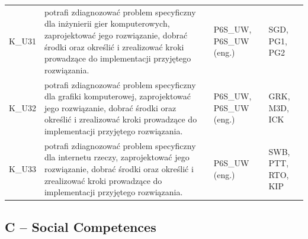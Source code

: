 \documentclass[12pt,a4paper]{article}
\begin{document}
{\begin{longtable}{m{1cm}m{8.8cm}m{2.1cm}m{2.5cm}}
\rowcolor{tableRowLight} K\_U31 & potrafi zdiagnozować problem specyficzny dla inżynierii gier komputerowych, zaprojektować jego rozwiązanie, dobrać środki oraz określić i zrealizować kroki prowadzące do implementacji przyjętego rozwiązania. & {\scriptsize P6S\_UW, P6S\_UW {\scriptsize (eng.)}} & {\scriptsize SGD, PG1, PG2} \\
\rowcolor{tableRowAlt} K\_U32 & potrafi zdiagnozować problem specyficzny dla grafiki komputerowej, zaprojektować jego rozwiązanie, dobrać środki oraz określić i zrealizować kroki prowadzące do implementacji przyjętego rozwiązania. & {\scriptsize P6S\_UW, P6S\_UW {\scriptsize (eng.)}} & {\scriptsize GRK, M3D, ICK} \\
\rowcolor{tableRowLight} K\_U33 & potrafi zdiagnozować problem specyficzny dla internetu rzeczy, zaprojektować jego rozwiązanie, dobrać środki oraz określić i zrealizować kroki prowadzące do implementacji przyjętego rozwiązania. & {\scriptsize P6S\_UW {\scriptsize (eng.)}} & {\scriptsize SWB, PTT, RTO, KIP} \\
\bottomrule
\end{longtable}}

\subsection*{C -- Social Competences}
\end{document}
